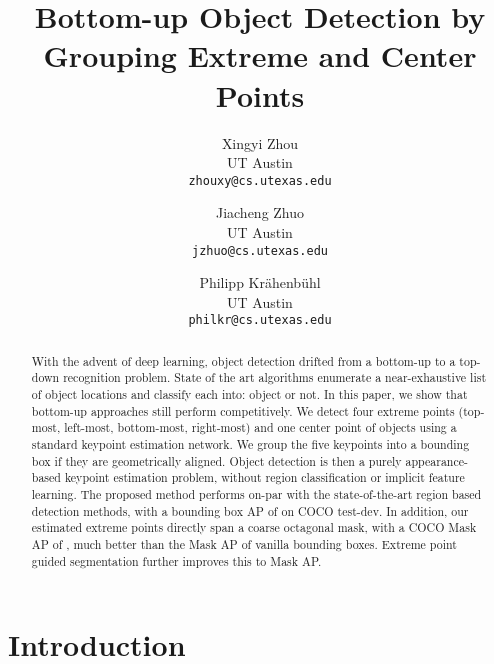 \documentclass[10pt,twocolumn,letterpaper]{article}
\begin{document}
\tracingall
\title{Bottom-up Object Detection by Grouping Extreme and Center Points}

\author{Xingyi Zhou\\
UT Austin\\
{\tt\small zhouxy@cs.utexas.edu}
\and
Jiacheng Zhuo\\
UT Austin\\
{\tt\small jzhuo@cs.utexas.edu}
\and
Philipp Kr\"ahenb\"uhl\\
UT Austin\\
{\tt\small philkr@cs.utexas.edu}
}

\maketitle


\begin{abstract}
With the advent of deep learning, object detection drifted from a bottom-up to a top-down recognition problem.
State of the art algorithms enumerate a near-exhaustive list of object locations and classify each into: object or not.
In this paper, we show that bottom-up approaches still perform competitively.
We detect four extreme points (top-most, left-most, bottom-most, right-most) and one center point of objects using a standard keypoint estimation network.
We group the five keypoints into a bounding box if they are geometrically aligned. 
Object detection is then a purely appearance-based keypoint estimation problem, without region classification or implicit feature learning. 
The proposed method performs on-par with the state-of-the-art region based detection methods, with a bounding box AP of  on COCO test-dev.
In addition, our estimated extreme points directly span a coarse octagonal mask, with a COCO Mask AP of , much better than the Mask AP of vanilla bounding boxes.
Extreme point guided segmentation further improves this to  Mask AP.
\end{abstract}



\section{Introduction}
\end{document}
